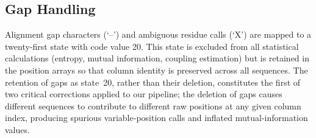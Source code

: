 \subsection{Gap Handling}
\label{sec:gray-gaps}

Alignment gap characters (`--') and ambiguous residue calls (`X') are mapped to
a twenty-first state with code value 20.  This state is excluded from all
statistical calculations (entropy, mutual information, coupling estimation)
but is retained in the position arrays so that column identity is preserved
across all sequences.  The retention of gaps as state~20, rather than their
deletion, constitutes the first of two critical corrections applied to our
pipeline; the deletion of gaps causes different sequences to contribute to
different raw positions at any given column index, producing spurious
variable-position calls and inflated mutual-information values.
